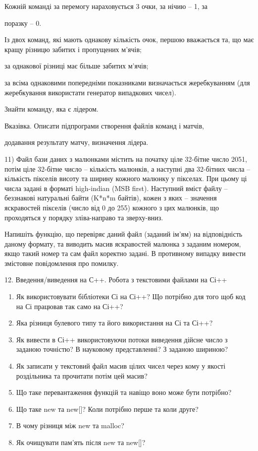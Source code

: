 \documentclass[]{article}
\makeatletter
\newcommand{\xslalph}[1]{\expandafter\@xslalph\csname c@#1\endcsname}
\newcommand{\@xslalph}[1]{%
    \ifcase#1\or а\or б\or в\or г\or д\or e\or є\or ж\or з\or i%
    \or й\or к\or л\or м\or н\or о\or п\or р\or с\or т%
    \or у\or ф\or х\or ц\or ч\or ш\or ю\or я\or аа\or бб\or вв%
    \else\@ctrerr\fi%
}
\makeatother
\begin{document}
\begin{enumerate}
\begin{enumerate}[label=\xslalph*)]
\begin{enumerate}
\begin{enumerate}[label=\xslalph*)]
Кожній команді за перемогу нараховується 3 очки, за нічию -- 1, за

поразку -- 0.

Із двох команд, які мають однакову кількість очок, першою вважається та,
що має кращу різницю забитих і пропущених м'ячів;

за однакової різниці має більше забитих м'ячів;

за всіма однаковими попередніми показниками визначається жеребкуванням
(для жеребкування використати генератор випадкових чисел).

Знайти команду, яка є лідером.

Вказівка. Описати підпрограми створення файлів команд і матчів,

додавання результату матчу, визначення лідера.

11) Файл бази даних з малюнками містить на початку ціле 32-бітне число
2051, потім ціле 32-бітне число -- кількість малюнків, а наступні два
32-бітних числа -- кількість пікселів висоту та ширину кожного малюнку у
пікселах. При цьому ці числа задані в форматі high-indian (MSB first).
Наступний вміст файлу -- беззнакові натуральні байти (K*n*m байтів),
кожен з яких -- значення яскравостей пікселів (число від 0 до 255)
кожного з цих малюнків, що проходяться у порядку зліва-направо та
зверху-вниз.

Напишіть функцію, що перевіряє даний файл (заданий ім'ям) на
відповідність даному формату, та виводить масив яскравостей малюнка з
заданим номером, якщо такий номер та сам файл коректно задані. В
противному випадку вивести змістовне повідомлення про помилку.

12. Введення/виведення на С++. Робота з текстовими файлами на Сі++

\begin{enumerate}
\def\labelenumi{\arabic{enumi})}
\item
  Як використовувати бібліотеки Сі на Сі++? Що потрібно для того щоб код
  на Сі працював так само на Сі++?
\item
  Яка різниця булевого типу та його використання на Сі та Сі++?
\item
  Як вивести в Сі++ використовуючи потоки виведення дійсне число з
  заданою точністю? В науковому представленні? З заданою шириною?
\item
  Як записати у текстовий файл масив цілих чисел через кому у якості
  роздільника та прочитати потім цей масив?
\item
  Що таке перевантаження функцій та навіщо воно може бути потрібно?
\item
  Що таке new та new{[}{]}? Коли потрібно перше та коли друге?
\item
  В чому різниця між new та malloc?
\item
  Як очищувати пам'ять після new та new{[}{]}?
\end{enumerate}


\end{enumerate}
\end{enumerate}
\end{enumerate}
\end{enumerate}
\end{document}
